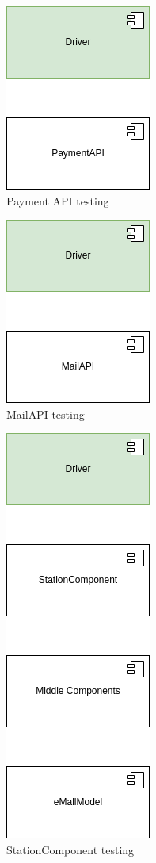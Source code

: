 \begin{figure}[H]
    \centering
    \includegraphics[keepaspectratio]{Testing/emall/payment.png}
    \caption{Payment \ac{API} testing}
\end{figure}
\begin{figure}[H]
    \centering
    \includegraphics[keepaspectratio]{Testing/emall/mail.png}
    \caption{Mail\ac{API} testing}
\end{figure}
\begin{figure}[H]
    \centering
    \includegraphics[keepaspectratio]{Testing/emall/station.png}
    \caption{StationComponent testing}
\end{figure}
